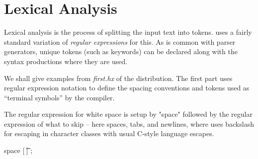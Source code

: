 \documentclass[11pt]{article} %
\begin{document}
\section{Lexical Analysis}
\label{sec:tokens}

Lexical analysis is the process of splitting the input text into tokens. \HAX uses a fairly standard
variation of \emph{regular expressions} for this.  As is common with parser generators, unique
tokens (such as keywords) can be declared along with the syntax productions where they are used.

We shall give examples from \emph{first.hx} of the \HAX distribution. The first part uses regular
expression notation to define the spacing conventions and tokens used as ``terminal symbols'' by the
compiler.

\begin{example}\label{ex:space}
  The regular expression for white space is setup by "space" followed by the regular expression of
  what to skip -- here spaces, tabs, and newlines, where \HAX uses backslash for escaping in
  character classes with usual C-style language escapes.
\begin{code}
space [ \t\n] ;
\end{code}
\end{example}
\end{document}
